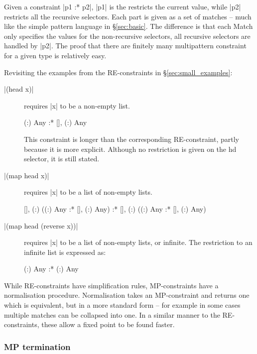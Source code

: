 \documentclass[preprint]{sigplanconf}
\newcommand{\C}[1]{\textsf{#1}}
\begin{document}
Given a constraint |p1 :* p2|, |p1| is the restricts the current value, while |p2| restricts all the recursive selectors. Each part is given as a set of matches -- much like the simple pattern language in \S\ref{sec:basic}. The difference is that each \C{Match} only specifies the values for the non-recursive selectors, all recursive selectors are handled by |p2|. The proof that there are finitely many multipattern constraint for a given type is relatively easy.

Revisiting the examples from the RE-constraints in \S\ref{sec:small_examples}:

\begin{description}
\item[|(head x)|] requires |x| to be a non-empty list.

    \begin{code}
    {(:) Any} :* {[], (:) Any}
    \end{code}

    This constraint is longer than the corresponding RE-constraint, partly because it is more explicit. Although no restriction is given on the \C{hd} selector, it is still stated.

\item[|(map head x)|] requires |x| to be a list of non-empty lists.

    \begin{code}
    {[], (:) ({(:) Any} :* {[], (:) Any})}
    :*
    {[], (:) ({(:) Any} :* {[], (:) Any})}
    \end{code}

\item[|(map head (reverse x))|] requires |x| to be a list of non-empty lists, or infinite. The restriction to an infinite list is expressed as:

    \begin{code}
    {(:) Any} :* {(:) Any}
    \end{code}
\end{description}

While RE-constraints have simplification rules, MP-constraints have a normalisation procedure. Normalisation takes an MP-constraint and returns one which is equivalent, but in a more standard form -- for example in some cases multiple matches can be collapsed into one. In a similar manner to the RE-constraints, these allow a fixed point to be found faster.

\subsubsection{MP termination}
\end{document}
